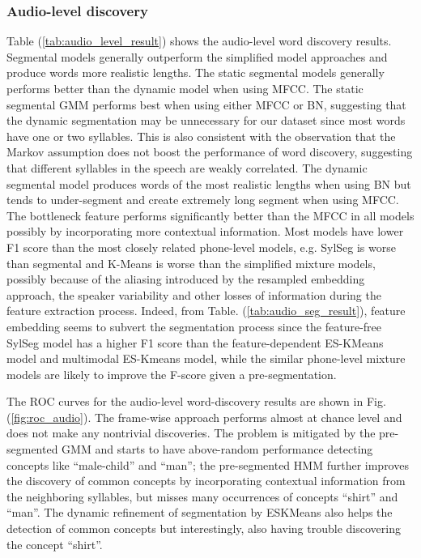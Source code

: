 \documentclass[journal]{IEEEtran}
\begin{document}
\subsubsection{Audio-level discovery}
Table (\ref{tab:audio_level_result}) shows the audio-level word discovery results. Segmental models generally outperform the simplified model approaches and produce words more realistic lengths. The static segmental models generally performs better than the dynamic model when using MFCC. The static segmental GMM performs best when using either MFCC or BN, suggesting that the dynamic segmentation may be unnecessary for our dataset since most words have one or two syllables. This is also consistent with the observation that the Markov assumption does not boost the performance of word discovery, suggesting that different syllables in the speech are weakly correlated. The dynamic segmental model produces words of the most realistic lengths when using BN but tends to under-segment and create extremely long segment when using MFCC. The bottleneck feature performs significantly better than the MFCC in all models possibly by incorporating more contextual information. Most models have lower F1 score than the most closely related phone-level models, e.g. SylSeg is worse than segmental and K-Means is worse than the simplified mixture models, possibly because of the aliasing introduced by the resampled embedding approach, the speaker variability and other losses of information during the feature extraction process. Indeed, from Table. (\ref{tab:audio_seg_result}), feature embedding seems to subvert the segmentation process since the feature-free SylSeg model has a higher F1 score than the feature-dependent ES-KMeans model and multimodal ES-Kmeans model, while the similar phone-level mixture models are likely to improve the F-score given a pre-segmentation. 

The ROC curves for the audio-level word-discovery results are shown in Fig. (\ref{fig:roc_audio}). The frame-wise approach performs almost at chance level and does not make any nontrivial discoveries. The problem is mitigated by the pre-segmented GMM and starts to have above-random performance detecting concepts like ``male-child'' and ``man''; the pre-segmented HMM further improves the discovery of common concepts by incorporating contextual information from the neighboring syllables, but misses many occurrences of concepts ``shirt'' and ``man''. The dynamic refinement of segmentation by ESKMeans also helps the detection of common concepts but interestingly, also having trouble discovering the concept ``shirt''.   
\end{document}
